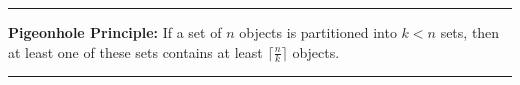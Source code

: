 \documentclass[a4paper]{extarticle}
\newcommand{\Ex}{\textbf{Example:}\ }
\newcommand{\ceil}[1]{\lceil #1 \rceil}
\newcommand{\sep}{\vspace{5pt}\noindent\hrule\vspace{5pt}}
\newcommand{\todo}[1]{\textcolor{red}{TODO: #1}}
\begin{document}
\begin{multicols*}{2}

\sep

\textbf{Pigeonhole Principle: } If a set of $n$ objects is partitioned into
$k<n$ sets, then at least one of these sets contains at least
$\ceil{\tfrac{n}{k}}$ objects.

\sep


\end{multicols*}
\end{document}
